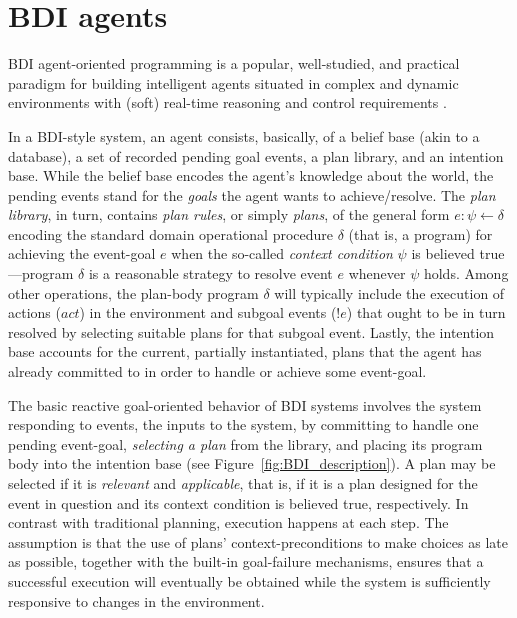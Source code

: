 \documentclass{article}
\begin{document}
\section{BDI agents}

BDI agent-oriented programming is a popular, well-studied, and practical paradigm
for building intelligent agents situated in complex and dynamic environments with
(soft) real-time reasoning and control requirements
\cite{Georgeff89-PRS,Benfield:AAMAS06}.

In a BDI-style system, an agent consists, basically, of a belief base (akin to a
database), a set of recorded pending goal events, a plan library, and an
intention base. While the belief base encodes the agent's knowledge about the
world, the pending events stand for the \emph{goals} the agent wants to
achieve/resolve.
The \textit{plan library}, in turn, contains \emph{plan rules}, or simply
\emph{plans}, of the general form $e: \psi \leftarrow \delta$ encoding the
standard domain operational procedure $\delta$ (that is, a program) for achieving
the event-goal $e$ when the so-called \textit{context condition} $\psi$ is
believed true---program $\delta$ is a reasonable strategy to resolve event $e$
whenever $\psi$ holds. Among other operations, the plan-body program $\delta$
will typically include the execution of actions ($act$) in the environment and
subgoal events ($!e$) that ought to be in turn resolved by selecting suitable
plans for that subgoal event. Lastly, the intention base accounts for the
current, partially instantiated, plans that the agent has already committed to in
order to handle or achieve some event-goal.


The basic reactive goal-oriented behavior of BDI systems involves the system
responding to events, the inputs to the system, by committing to handle one
pending event-goal, \textit{selecting a plan} from the library, and placing its
program body  into the intention base (see Figure~\ref{fig:BDI_description}).
A plan may be selected if it is \textit{relevant} and \textit{applicable}, that is, if it
is a plan designed for the event in question and its context condition is
believed true, respectively.
In contrast with traditional planning, execution happens at each step. The
assumption is that the use of plans' context-preconditions to make choices as
late as possible, together with the built-in goal-failure mechanisms, ensures
that a successful execution will eventually be obtained while the system is
sufficiently responsive to changes in the environment.
\end{document}

